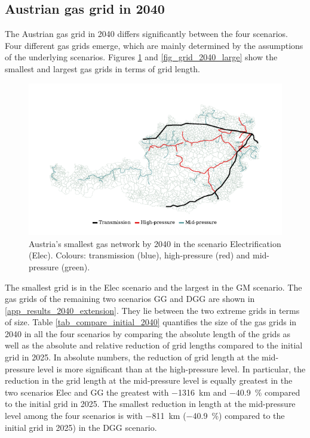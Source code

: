 \subsection{Austrian gas grid in 2040}\label{res_grid2040}
The Austrian gas grid in 2040 differs significantly between the four scenarios. Four different gas grids emerge, which are mainly determined by the assumptions of the underlying scenarios. Figures \ref{fig_grid_2040_small} and \ref{fig_grid_2040_large} show the smallest and largest gas grids in terms of grid length. 

\begin{figure}[h]
	\centering
	\includegraphics[width=1\linewidth]{figures/results/gas_grid_2040_elec.pdf}
	\caption{Austria's smallest gas network by 2040 in the scenario Electrification (Elec). Colours: transmission (blue), high-pressure (red) and mid-pressure (green).}
	\label{fig_grid_2040_small}
\end{figure}

The smallest grid is in the Elec scenario and the largest in the GM scenario. The gas grids of the remaining two scenarios GG and DGG are shown in \ref{app_results_2040_extension}. They lie between the two extreme grids in terms of size. Table \ref{tab_compare_initial_2040} quantifies the size of the gas grids in 2040 in all the four scenarios by comparing the absolute length of the grids as well as the absolute and relative reduction of grid lengths compared to the initial grid in 2025.  In absolute numbers, the reduction of grid length at the mid-pressure level is more significant than at the high-pressure level. In particular, the reduction in the grid length at the mid-pressure level is equally greatest in the two scenarios Elec and GG the greatest with \SI{-1316}{km} and  \SI{-40.9}{\%} compared to the initial grid in 2025. The smallest reduction in length at the mid-pressure level among the four scenarios is with \SI{-811}{km} (\SI{-40.9}{\%}) compared to the initial grid in 2025) in the DGG scenario. 

